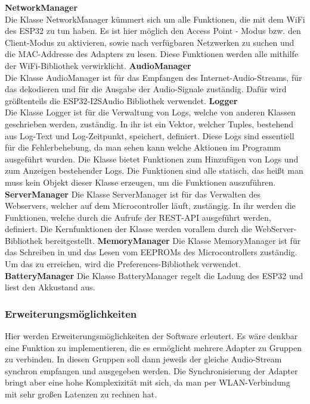 \documentclass[]{article}
\begin{document}
\textbf{NetworkManager} \\
Die Klasse NetworkManager kümmert sich um alle Funktionen, die mit dem WiFi des ESP32 zu tun haben. Es ist hier möglich den Access Point - Modus bzw. den Client-Modus zu aktivieren, sowie nach verfügbaren Netzwerken zu suchen und die MAC-Addresse des Adapters zu lesen. Diese Funktionen werden alle mithilfe der WiFi-Bibliothek verwirklicht.
\vspace{4mm}\newline
\textbf{AudioManager} \\
Die Klasse AudioManager ist für das Empfangen des Internet-Audio-Streams, für das dekodieren und für die Ausgabe der Audio-Signale zuständig. Dafür wird größtenteils die ESP32-I2SAudio Bibliothek verwendet.
\vspace{4mm}\newline
\textbf{Logger} \\
Die Klasse Logger ist für die Verwaltung von Logs, welche von anderen Klassen geschrieben werden, zuständig. In ihr ist ein Vektor, welcher Tuples, bestehend aus Log-Text und Log-Zeitpunkt, speichert, definiert. Diese Logs sind essentiell für die Fehlerbehebung, da man sehen kann welche Aktionen im Programm ausgeführt wurden. Die Klasse bietet Funktionen zum Hinzufügen von Logs und zum Anzeigen bestehender Logs. Die Funktionen sind alle statisch, das heißt man muss kein Objekt dieser Klasse erzeugen, um die Funktionen auszuführen.
\vspace{4mm}\newline
\textbf{ServerManager}
Die Klasse ServerManager ist für das Verwalten des Webservers, welcher auf dem Microcontroller läuft, zustängig. In ihr werden die Funktionen, welche durch die Aufrufe der REST-API ausgeführt werden, definiert. Die Kernfunktionen der Klasse werden vorallem durch die WebServer-Bibliothek bereitgestellt.
\vspace{4mm}\newline
\textbf{MemoryManager}
Die Klasse MemoryManager ist für das Schreiben in und das Lesen vom EEPROMs des Microcontrollers zuständig. Um das zu erreichen, wird die Preferences-Bibliothek verwendet.
\textbf{BatteryManager}
Die Klasse BatteryManager regelt die Ladung des ESP32 und liest den Akkustand aus.
\subsubsection{Erweiterungsmöglichkeiten}
Hier werden Erweiterungsmöglichkeiten der Software erleutert. Es wäre denkbar eine Funktion zu implementieren, die es ermöglicht mehrere Adapter zu Gruppen zu verbinden. In diesen Gruppen soll dann jeweils der gleiche Audio-Stream synchron empfangen und ausgegeben werden. Die Synchronisierung der Adapter bringt aber eine hohe Komplexizität mit sich, da man per WLAN-Verbindung mit sehr großen Latenzen zu rechnen hat.
\end{document}
